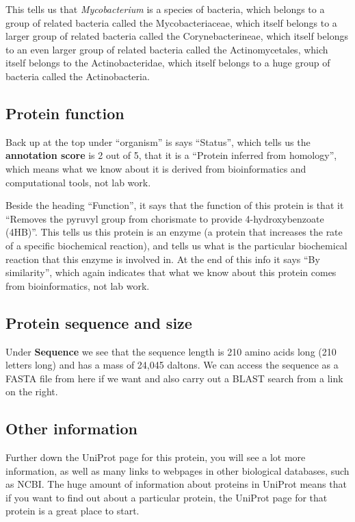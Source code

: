 \documentclass[
]{book}
\begin{document}
This tells us that \emph{Mycobacterium} is a species of bacteria, which belongs to a group of related bacteria called the Mycobacteriaceae, which itself belongs to a larger group of related bacteria called the Corynebacterineae, which itself belongs to an even larger group of related bacteria called the Actinomycetales, which itself belongs to the Actinobacteridae, which itself belongs to a huge group of bacteria called the Actinobacteria.

\hypertarget{protein-function}{%
\subsection{Protein function}\label{protein-function}}

Back up at the top under ``organism'' is says ``Status'', which tells us the \textbf{annotation score} is 2 out of 5, that it is a ``Protein inferred from homology'', which means what we know about it is derived from bioinformatics and computational tools, not lab work.

Beside the heading ``Function'', it says that the function of this protein is that it ``Removes the pyruvyl group from chorismate to provide 4-hydroxybenzoate (4HB)''. This tells us this protein is an enzyme (a protein that increases the rate of a specific biochemical reaction), and tells us what is the particular biochemical reaction that this enzyme is involved in. At the end of this info it says ``By similarity'', which again indicates that what we know about this protein comes from bioinformatics, not lab work.

\hypertarget{protein-sequence-and-size}{%
\subsection{Protein sequence and size}\label{protein-sequence-and-size}}

Under \textbf{Sequence} we see that the sequence length is 210 amino acids long (210 letters long) and has a mass of 24,045 daltons. We can access the sequence as a FASTA file from here if we want and also carry out a BLAST search from a link on the right.

\hypertarget{other-information}{%
\subsection{Other information}\label{other-information}}

Further down the UniProt page for this protein, you will see a lot more information, as well as many links to webpages in other biological databases, such as NCBI. The huge amount of information about proteins in UniProt means that if you want to find out about a particular protein, the UniProt page for that protein is a great place to start.
\end{document}
